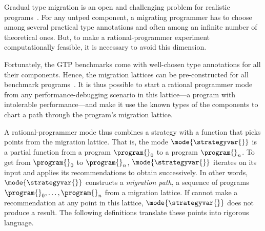 
Gradual type migration is an open and challenging problem for realistic
programs~\cite{rch:in-out-infer-gt, km:ts-type-evo,
mp:gt-decidable, ccew:gt-migrate, gc:gt-infer,
cagg-solver-based-migration,clps-popl-2020,js-infer,ruby-static-infer,unif-infer,
msi:gt-infer-hm,dyn-infer-ruby,profile-guided-typing,jstrace,gen-ts-decl,
lambdanet,nl2ptype,learn-types-big-data,ml-ts}. For
any untped component, a migrating programmer has to choose among several
practical type annotations and often among an infinite number of theoretical
ones. But, to make a rational-programmer experiment computationally feasible, it
is necessary to avoid this dimension.

Fortunately, the GTP benchmarks come with well-chosen type annotations for all
their components.  Hence, the migration lattices can be pre-constructed for all
benchmark programs~\citep{tfgnvf-popl-2016}.  It is thus possible to start a
rational programmer mode from any performance-debugging scenario in this
lattice---a program with intolerable performance---and make it use the known
types of the components to chart a path through the program's migration lattice.

A rational-programmer mode thus combines a strategy \strategyvar{} with a
function that picks points from the migration lattice. That is, the mode
$\mode{\strategyvar{}}$ is a partial function from a program $\program{}_0$ to a
program $\program{}_n$. To get from $\program{}_0$ to $\program{}_n$,
$\mode{\strategyvar{}}$ iterates \strategyvar{} on its input and applies its
recommendations to obtain successively.  In other words, $\mode{\strategyvar{}}$
constructs a \emph{migration path}, a sequence of programs ${\program{}_0},
\ldots, {\program{}_n}$ from a migration lattice. If \strategyvar{} cannot make
a recommendation at any point in this lattice, $\mode{\strategyvar{}}$ does not
produce a result. The following definitions translate these points into rigorous
language. 

